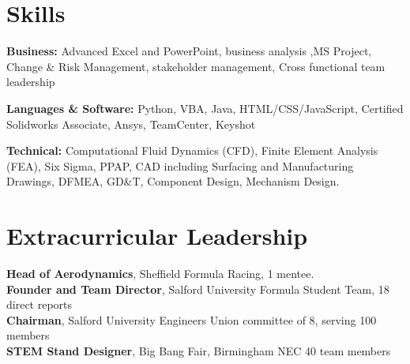 \documentclass[10pt]{article} %
\begin{document}
\vspace{-0.5cm}
\section*{Skills} 
\vspace{-0.25cm}

{\bf Business:} Advanced Excel and PowerPoint, business analysis ,MS  Project, Change \& Risk Management, stakeholder management, Cross functional team leadership

{\bf Languages \& Software:} Python, VBA, Java, HTML/CSS/JavaScript, Certified Solidworks Associate, Ansys, TeamCenter, Keyshot

{\bf Technical:} Computational Fluid Dynamics (CFD), Finite Element Analysis (FEA), Six Sigma, PPAP, CAD including Surfacing and Manufacturing Drawings, DFMEA, GD\&T, Component Design, Mechanism Design.
\vspace{-0.75cm}
\section*{Extracurricular Leadership} 
\vspace{-0.25cm}
{\bf Head of Aerodynamics}, Sheffield Formula Racing, 1 mentee.\\
{\bf Founder and Team Director}, Salford University Formula Student Team, 18 direct reports\\
{\bf Chairman}, Salford University Engineers Union committee of 8, serving 100 members\\
{\bf STEM Stand Designer}, Big Bang Fair, Birmingham NEC 40 team members\\
\end{document}
